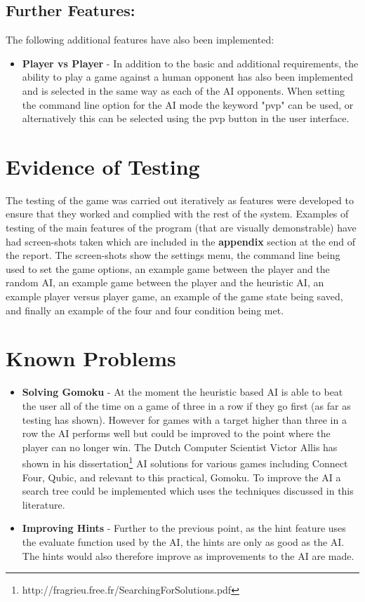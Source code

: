 \documentclass[11]{article}
\begin{document}
	\subsection{Further Features:}
		The following additional features have also been implemented:
		\begin{itemize}
			\item \textbf{Player vs Player } - In addition to the basic and additional requirements, the ability to play a game against a human opponent has also been implemented and is selected in the same way as each of the AI opponents. When setting the command line option for the AI mode the keyword "pvp" can be used, or alternatively this can be selected using the pvp button in the user interface.
		\end{itemize}
		
	\section{Evidence of Testing}	
		The testing of the game was carried out iteratively as features were developed to ensure that they worked and complied with the rest of the system. Examples of testing of the main features of the program (that are visually demonstrable) have had screen-shots taken which are included in the \textbf{appendix} section at the end of the report. The screen-shots show the settings menu, the command line being used to set the game options, an example game between the player and the random AI, an example game between the player and the heuristic AI, an example player versus player game, an example of the game state being saved, and finally an example of the four and four condition being met.
	\section{Known Problems}
		\begin{itemize}
			\item \textbf{Solving Gomoku} - At the moment the heuristic based AI is able to beat the user all of the time on a game of three in a row if they go first (as far as testing has shown). However for games with a target higher than three in a row the AI performs well but could be improved to the point where the player can no longer win. The Dutch Computer Scientist Victor Allis has shown in his dissertation\footnote{http://fragrieu.free.fr/SearchingForSolutions.pdf} AI solutions for various games including Connect Four, Qubic, and relevant to this practical, Gomoku. To improve the AI a search tree could be implemented which uses the techniques discussed in this literature.
			\item \textbf{Improving Hints} - Further to the previous point, as the hint feature uses the evaluate function used by the AI, the hints are only as good as the AI. The hints would also therefore improve as improvements to the AI are made.
		\end{itemize}
		
\end{document}
